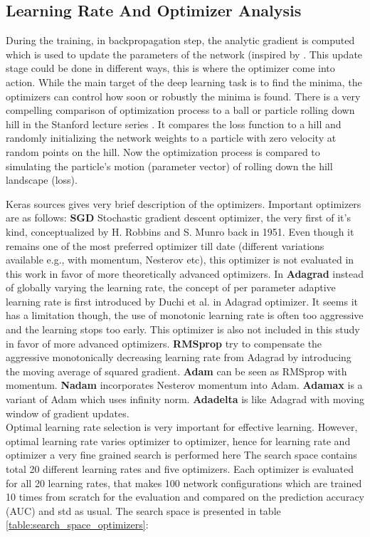 \subsection{Learning Rate And Optimizer Analysis}

During the training, in backpropagation step, the analytic gradient is computed which is used to update the parameters of the network (inspired by \cite{ruder}. This update stage could be done in different ways, 
this is where the optimizer come into action. While the main target of the deep learning task is to find the minima, the optimizers can control how soon or robustly the minima is found. There is a very compelling 
comparison of optimization process to a ball or particle rolling down hill in the Stanford lecture series \cite{cs231n}. It compares the loss function to a hill and randomly initializing the network weights to a particle with 
zero velocity at random points on the hill. Now the optimization process is compared to simulating the particle's motion (parameter vector) of rolling down the hill landscape (loss).

Keras sources \cite{kerasopt} gives very brief description of the optimizers. Important optimizers are as follows: \textbf{SGD} Stochastic gradient descent optimizer, the very first of it's kind, conceptualized by H. 
Robbins and S. Munro back in 1951. Even though it remains one of the most preferred optimizer till date 
(different variations available e.g., with momentum, Nesterov etc), this optimizer is not evaluated in this work in favor of more theoretically advanced optimizers. In \textbf{Adagrad} instead of globally varying the learning rate, 
the concept of per parameter adaptive learning rate is first introduced by Duchi et al. in Adagrad optimizer. It seems it has a limitation though, the use of monotonic learning rate is often too aggressive and the 
learning stops too early. This optimizer is also not included in this study in favor of more advanced optimizers. \textbf{RMSprop} try to compensate the aggressive monotonically decreasing learning rate from 
Adagrad by introducing the moving average of squared gradient. \textbf{Adam} can be seen as RMSprop with momentum. \textbf{Nadam} incorporates Nesterov momentum into Adam. \textbf{Adamax} is a variant 
of Adam which uses infinity norm. \textbf{Adadelta} is like Adagrad with moving window of gradient updates.\\

Optimal learning rate selection is very important for effective learning. However, optimal learning rate varies optimizer to optimizer, hence for learning rate and optimizer a very fine grained search is performed here
The search space contains total 20 different learning rates and five optimizers. Each optimizer is evaluated for all 20 learning rates, that makes 100 network configurations which are trained 10 times from scratch 
for the evaluation and compared on the prediction accuracy (AUC) and std as usual. The search space is presented in table \ref{table:search_space_optimizers}:

